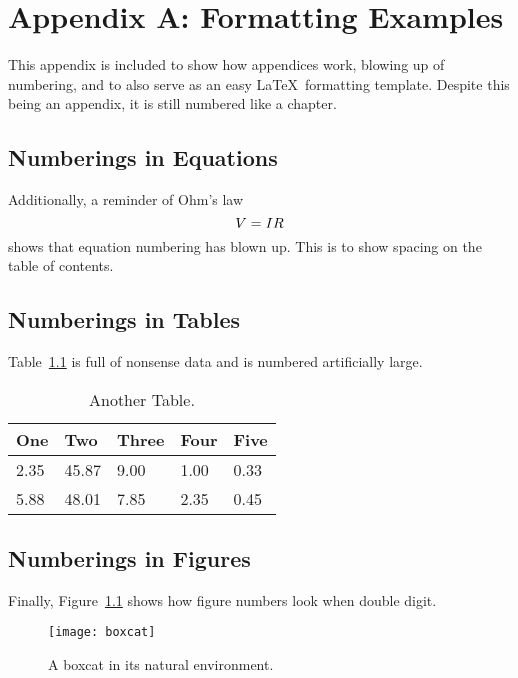 \chapter{Appendix A: Formatting Examples}

\setcounter{figure}{66}
\setcounter{table}{13}
\setcounter{equation}{41}
This appendix is included to show how appendices work, blowing up of numbering, and to also serve as an easy \LaTeX\ formatting template. Despite this being an appendix, it is still numbered like a chapter.

\section{Numberings in Equations}
Additionally, a reminder of Ohm's law
\begin{equation}{\label{eq:ohms law} }
V = IR
\end{equation} %
\noindent shows that equation numbering has blown up. This is to show spacing on the table of contents.
 
\section{Numberings in Tables}
Table~\ref{tab:exp2} is full of nonsense data and is numbered artificially large.

\begin{table}[!ht]
	\centering
	\begin{tabular}{@{} lllll @{}} 	
		\toprule %
		\footnotesize %
		One& Two  & Three  & Four  & Five  \\
		\midrule		
		2.35& 45.87  & 9.00  & 1.00  &0.33  \\
		5.88& 48.01  & 7.85  & 2.35  & 0.45 \\
		\bottomrule
	\end{tabular}
	\caption{Another Table.}
	\label{tab:exp2}
\end{table}

\section{Numberings in Figures}
Finally, Figure~\ref{fig: boxcat} shows how figure numbers look when double digit.

\begin{figure}[!ht]
	\centering
	\footnotesize
	\texttt{[image: boxcat]}
	\caption{A boxcat in its natural environment.}
	\label{fig: boxcat}
\end{figure}\vspace{-1em} %